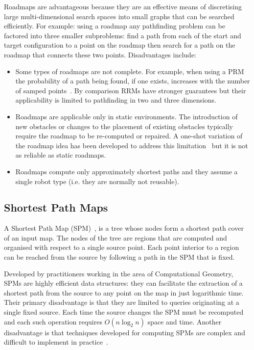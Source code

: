 Roadmaps are advantageous because they are an effective means of discretising
large multi-dimensional search spaces into small graphs that can be searched
efficiently. For example: using a roadmap any pathfinding problem can be
factored into three smaller subproblems: find a path from each of the start and
target configuration to a point on the roadmap then search for a path on the
roadmap that connects these two points. Disadvantages include:
\begin{itemize}
\item{Some types of roadmaps are not complete. For example, when using a PRM the probability of 
a path being found, if one exists, increases with the number  of samped points~\citep{barraquand97}. 
By comparison RRMs have stronger guarantees but their applicability
is limited to pathfinding in two and three dimensions.}
\item{Roadmaps are applicable only in static environments. The introduction of
new obstacles or changes to the placement of existing obstacles typically require 
the roadmap to be re-computed or repaired. A one-shot variation of the roadmap idea has been
developed to address this limitation~\citep{lavalle98} but it is not as reliable
as static roadmaps.}
\item{Roadmaps compute only approximately shortest paths and they assume a single 
robot type (i.e. they are normally not reusable).}
\end{itemize}

\subsection{Shortest Path Maps}
\label{cha::lit::graphs::spm}
A Shortest Path Map (SPM)~\citep{mitchell87,mitchell97}, is a tree whose nodes
form a shortest path cover of an input map.  The nodes of the tree are regions
that are computed and organised with respect to a single source point. Each
point interior to a region can be reached from the source by following a path in
the SPM that is fixed.

Developed by practitioners working in the area of Computational Geometry, SPMs
are highly efficient data structures: they can facilitate the extraction
of a shortest path from the source to any point on the map in just logarithmic time.
Their primary disadvantage is that they are limited to queries originating at
a single fixed source. Each time the source changes the SPM must be recomputed and
each such operation requires $O(n\log_2{n})$ space and time. 
Another disadvantage is that techniques developed for computing SPMs are complex 
and difficult to implement in practice~\citep{surazhsky05}. 

